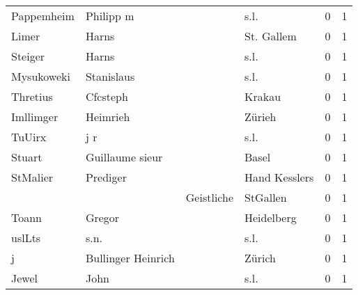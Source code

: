 \begin{tabular}{llllrr}
               Pappemheim &                          Philipp m &             &                                        s.l. &          0 &         1 \\
                    Limer &                              Harns &             &                                  St. Gallem &          0 &         1 \\
                  Steiger &                              Harns &             &                                        s.l. &          0 &         1 \\
               Mysukoweki &                         Stanislaus &             &                                        s.l. &          0 &         1 \\
                 Thretius &                           Cfcsteph &             &                                      Krakau &          0 &         1 \\
                Imllimger &                           Heimrieh &             &                                      Zürieh &          0 &         1 \\
                   TuUirx &                                j r &             &                                        s.l. &          0 &         1 \\
                   Stuart &                    Guillaume sieur &             &                                       Basel &          0 &         1 \\
                 StMalier &                           Prediger &             &                               Hand Kesslers &          0 &         1 \\
                          &                                    &  Geistliche &                                    StGallen &          0 &         1 \\
                    Toann &                             Gregor &             &                                  Heidelberg &          0 &         1 \\
                   uslLts &                               s.n. &             &                                        s.l. &          0 &         1 \\
                        j &                 Bullinger Heinrich &             &                                      Zürich &          0 &         1 \\
                    Jewel &                               John &             &                                        s.l. &          0 &         1 \\

\end{tabular}
